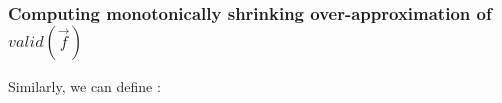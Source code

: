 \subsubsection{Computing monotonically shrinking over-approximation of $valid(\vec{f})$}\label{subsub_loop}
Similarly,
we can define :
%
%


